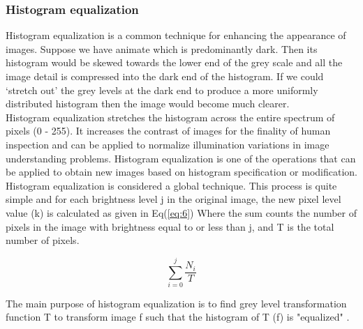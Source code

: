 \subsubsection{Histogram equalization}
Histogram equalization is a common technique for enhancing the appearance of images.
Suppose we have animate which is predominantly dark. Then its histogram would be skewed
towards the lower end of the grey scale and all the image detail is compressed into the
dark end of the histogram. If we could `stretch out' the grey levels at the dark end to
produce a more uniformly distributed histogram then the image would become much clearer.\\
Histogram equalization stretches the histogram across the entire spectrum of pixels (0 - 255).
It increases the contrast of images for the finality of human inspection and can be applied
to normalize illumination variations in image understanding problems. Histogram equalization
is one of the operations that can be applied to obtain new images based on histogram specification
or modification. Histogram equalization is considered a global technique. This process is quite
simple and for each brightness level j in the original image, the new pixel level value (k)
is calculated as given in Eq(\ref{eq:6}) Where the sum counts the number of pixels in the image with
brightness equal to or less than j, and T is the total number of pixels.

        \begin{equation}
                \sum_{i = 0}^{j} \frac{N_i}{T}\label{eq:6}
        \end{equation}

\hspace{-0.6cm}The main purpose of histogram equalization is to find grey level transformation function T
to transform image f such that the histogram of T (f) is "equalized" \cite{1.13}.

